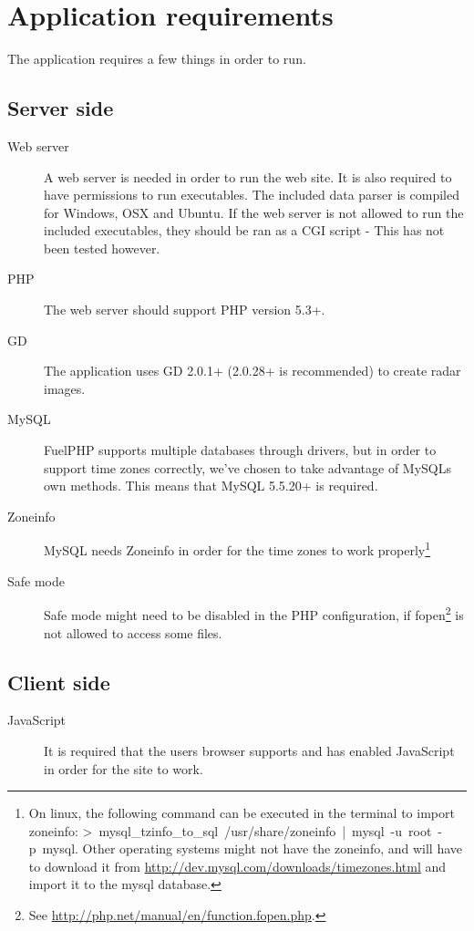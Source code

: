 \chapter{Application requirements}
\label{sec:application_requirements}
The application requires a few things in order to run.

\section{Server side}
\begin{description}
\item[Web server] A web server is needed in order to run the web site. It is also required to have permissions to run executables. The included data parser is compiled for Windows, OSX and Ubuntu. If the web server is not allowed to run the included executables, they should be ran as a CGI script - This has not been tested however.
\item[PHP] The web server should support PHP version 5.3+.
\item[GD] The application uses GD 2.0.1+ (2.0.28+ is recommended) to create radar images.
\item[MySQL] FuelPHP supports multiple databases through drivers, but in order to support time zones correctly, we've chosen to take advantage of MySQLs own methods. This means that MySQL 5.5.20+ is required.
\item[Zoneinfo] MySQL needs Zoneinfo in order for the time zones to work properly\footnote{On linux, the following command can be executed in the terminal to import zoneinfo: \mbox{\textsf{> mysql\_tzinfo\_to\_sql /usr/share/zoneinfo | mysql -u root -p mysql}}. Other operating systems might not have the zoneinfo, and will have to download it from \url{http://dev.mysql.com/downloads/timezones.html} and import it to the mysql database.}
\item[Safe mode] Safe mode might need to be disabled in the PHP configuration, if \textsf{fopen}\footnote{See \url{http://php.net/manual/en/function.fopen.php}.} is not allowed to access some files.
\end{description}

\section{Client side}
\begin{description}
\item[JavaScript] It is required that the users browser supports and has enabled JavaScript in order for the site to work.
\end{description}
